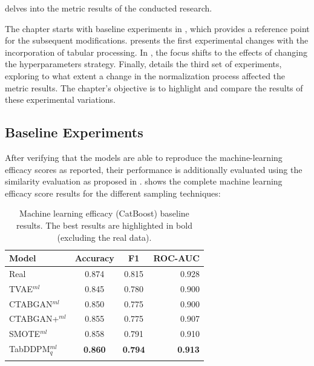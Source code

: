  delves into the metric results of the conducted research. 

The chapter starts with baseline experiments in , which provides a reference point for the subsequent modifications. 
 presents the first experimental changes with the incorporation of tabular processing. 
In , the focus shifts to the effects of changing the hyperparameters strategy.
Finally,  details the third set of experiments, exploring to what extent a change in the normalization process affected the metric results. 
The chapter's objective is to highlight and compare the results of these experimental variations.

\subsection{Baseline Experiments}
\label{ch:Baseline}

After verifying that the models are able to reproduce the machine-learning efficacy scores as reported,
their performance is additionally evaluated using the similarity evaluation as proposed in .
 shows the complete machine learning efficacy score results for the different sampling techniques:

\begin{table}[h]
	\centering
	\begin{tabular}{lccr}
		\toprule
		\textbf{Model}     & \textbf{Accuracy} & \textbf{F1}    & \textbf{ROC-AUC} \\
		\midrule
		Real               & 0.874              & 0.815          & 0.928            \\
		TVAE$^{ml}$        & 0.845              & 0.780          & 0.900            \\
		CTABGAN$^{ml}$     & 0.850              & 0.775          & 0.900            \\
		CTABGAN+$^{ml}$    & 0.855              & 0.775          & 0.907            \\
		SMOTE$^{ml}$       & 0.858              & 0.791          & 0.910            \\
		TabDDPM$^{ml}_{q}$ & \textbf{0.860}     & \textbf{0.794} & \textbf{0.913}   \\
		\bottomrule
		\multicolumn{4}{c}{}\\[-0.6em]
	\end{tabular}
	\caption[ML-efficacy Baseline]{Machine learning efficacy (CatBoost) baseline results. The best results are highlighted in bold (excluding the real data).}
	\label{tab:ml_baseline}
\end{table}


